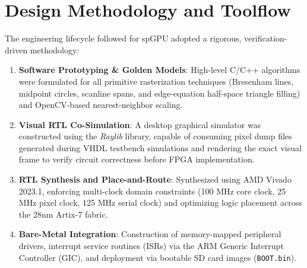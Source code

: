 \section{Design Methodology and Toolflow}
The engineering lifecycle followed for spGPU adopted a rigorous, verification-driven methodology:
\begin{enumerate}
    \item \textbf{Software Prototyping \& Golden Models}: High-level C/C++ algorithms were formulated for all primitive rasterization techniques (Bresenham lines, midpoint circles, scanline spans, and edge-equation half-space triangle filling) and OpenCV-based nearest-neighbor scaling.
    \item \textbf{Visual RTL Co-Simulation}: A desktop graphical simulator was constructed using the \textit{Raylib} library, capable of consuming pixel dump files generated during VHDL testbench simulations and rendering the exact visual frame to verify circuit correctness before FPGA implementation.
    \item \textbf{RTL Synthesis and Place-and-Route}: Synthesized using AMD Vivado 2023.1, enforcing multi-clock domain constraints (100 MHz core clock, 25 MHz pixel clock, 125 MHz serial clock) and optimizing logic placement across the 28nm Artix-7 fabric.
    \item \textbf{Bare-Metal Integration}: Construction of memory-mapped peripheral drivers, interrupt service routines (ISRs) via the ARM Generic Interrupt Controller (GIC), and deployment via bootable SD card images (\texttt{BOOT.bin}).
\end{enumerate}
